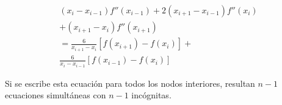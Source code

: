 \documentclass[conference]{IEEEtran}
\begin{document}
\begin{multline}
	(x_{i} - x_{i - 1})f''(x_{i - 1}) + 2(x_{i + 1} - x_{i - 1})f''(x_{i}) \\
	+ (x_{i + 1} - x_{i})f''(x_{i + 1}) \\
	= \frac{6}{x_{i + 1} - x_{i}}[f(x_{i + 1}) - f(x_{i})] + \\
	\frac{6}{x_{i} - x_{i - 1}}[f(x_{i - 1}) - f(x_{i})]
	\label{eq:18.37}
\end{multline}

Si se escribe esta ecuación para todos los nodos interiores,
resultan $n - 1$ ecuaciones simultáneas con $n - 1$ incógnitas.


\end{document}
